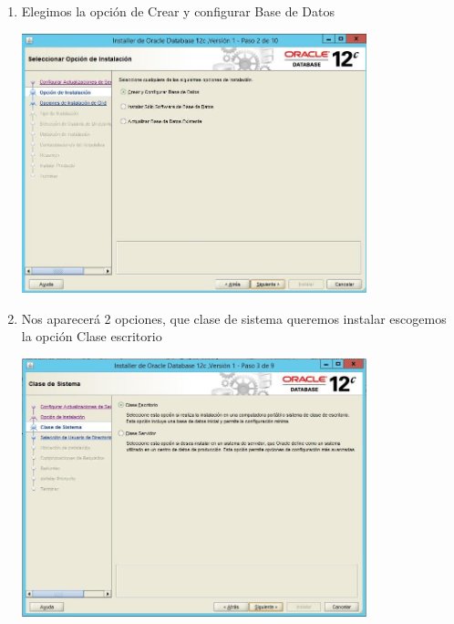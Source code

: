 \begin{enumerate}[1.]
	\hfill \break
	\hfill \break
	\hfill \break
	\hfill \break
	\hfill \break
	\hfill \break
	\hfill \break
	\hfill \break
	\item Elegimos la opci\'on de Crear y configurar Base de Datos\\
	\begin{center}
	\includegraphics[width=10cm]{./Imagenes/img14} 
	\end{center}

	\item Nos aparecer\'a 2 opciones, que clase de sistema queremos instalar escogemos la opci\'on Clase escritorio\\
	\begin{center}
	\includegraphics[width=10cm]{./Imagenes/img15} 
	\end{center}


\end{enumerate}
